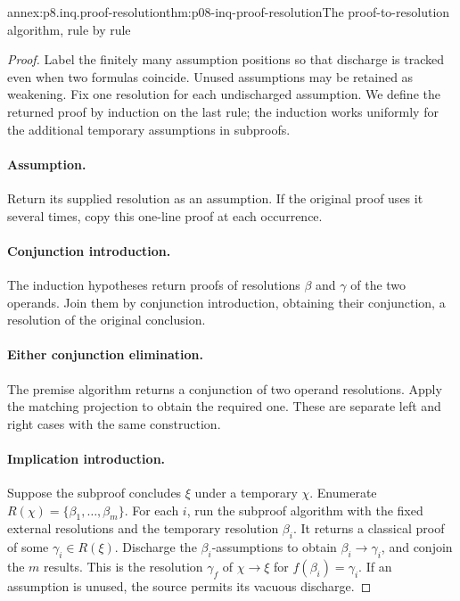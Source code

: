 \begin{annexitem}{annex:p8.inq.proof-resolution}{thm:p08-inq-proof-resolution}{The proof-to-resolution algorithm, rule by rule}
\begin{proof}
Label the finitely many assumption positions so that discharge is tracked
even when two formulas coincide. Unused assumptions may be retained as
weakening. Fix one resolution for each undischarged assumption. We define
the returned proof by induction on the last rule; the induction works
uniformly for the additional temporary assumptions in subproofs.

\paragraph{Assumption.}
Return its supplied resolution as an assumption. If the original proof
uses it several times, copy this one-line proof at each occurrence.

\paragraph{Conjunction introduction.}
The induction hypotheses return proofs of resolutions \(\beta\) and
\(\gamma\) of the two operands. Join them by conjunction introduction,
obtaining their conjunction, a resolution of the original conclusion.
\paragraph{Either conjunction elimination.}
The premise algorithm returns a conjunction of two operand resolutions.
Apply the matching projection to obtain the required one. These are
separate left and right cases with the same construction.

\paragraph{Implication introduction.}
Suppose the subproof concludes \(\xi\) under a temporary \(\chi\).
Enumerate \(R(\chi)=\{\beta_1,\ldots,\beta_m\}\).
For each \(i\), run the subproof algorithm with the fixed external
resolutions and the temporary resolution \(\beta_i\). It returns a
classical proof of some \(\gamma_i\in R(\xi)\). Discharge the
\(\beta_i\)-assumptions to obtain \(\beta_i\to\gamma_i\), and conjoin
the \(m\) results. This is the resolution \(\gamma_f\) of
\(\chi\to\xi\) for \(f(\beta_i)=\gamma_i\). If an assumption is unused,
the source permits its vacuous discharge.


\end{proof}
\end{annexitem}
